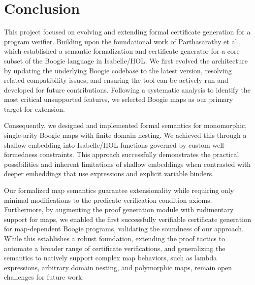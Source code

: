 \documentclass[11pt]{article}
\begin{document}



\section{Conclusion}
\label{sec:conclusion}

This project focused on evolving and extending formal certificate generation for a program verifier.
Building upon the foundational work of Parthasarathy et al.,
which established a semantic formalization and certificate generator for a core subset of the Boogie language in Isabelle/HOL.
We first evolved the architecture by updating the underlying Boogie codebase to the latest version, resolving related compatibility issues, and ensuring the tool can be actively run and developed for future contributions.
Following a systematic analysis to identify the most critical unsupported features, we selected Boogie maps as our primary target for extension.

Consequently, we designed and implemented formal semantics for monomorphic, single-arity Boogie maps with finite domain nesting.
We achieved this through a shallow embedding into Isabelle/HOL functions governed by custom well-formedness constraints.
This approach successfully demonstrates the practical possibilities
and inherent limitations of shallow embeddings when contrasted
with deeper embeddings that use expressions and explicit variable binders.

Our formalized map semantics guarantee extensionality while requiring only minimal modifications to the predicate verification condition axioms.
Furthermore, by augmenting the proof generation module with rudimentary support for maps,
we enabled the first successfully verifiable certificate generation for map-dependent Boogie programs, validating the soundness of our approach.
While this establishes a robust foundation, extending the proof tactics to automate a broader range of certificate verifications,
and generalizing the semantics to natively support complex map behaviors,
such as lambda expressions, arbitrary domain nesting, and polymorphic maps, remain open challenges for future work.

\pagebreak



\end{document}

